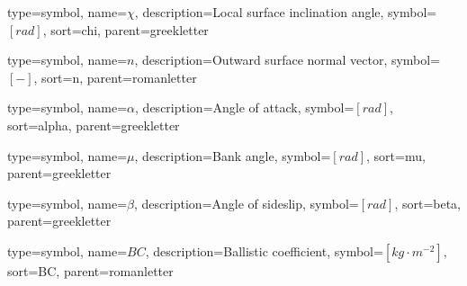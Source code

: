{
	type=symbol, %
	name={\ensuremath{\chi}}, %
	description={Local surface inclination angle}, %
	symbol={$\left[rad \right]$}, %
	sort=chi, %
	parent=greekletter %
}

{
	type=symbol, %
	name={\ensuremath{n}}, %
	description={Outward surface normal vector}, %
	symbol={$\left[- \right]$}, %
	sort=n, %
	parent=romanletter %
}

{
	type=symbol, %
	name={\ensuremath{\alpha}}, %
	description={Angle of attack}, %
	symbol={$\left[rad \right]$}, %
	sort=alpha, %
	parent=greekletter %
}

{
	type=symbol, %
	name={\ensuremath{\mu}}, %
	description={Bank angle}, %
	symbol={$\left[rad \right]$}, %
	sort=mu, %
	parent=greekletter %
}

{
	type=symbol, %
	name={\ensuremath{\beta}}, %
	description={Angle of sideslip}, %
	symbol={$\left[rad \right]$}, %
	sort=beta, %
	parent=greekletter %
}

{
type=symbol, %
name={\ensuremath{BC}}, %
description={Ballistic coefficient}, %
symbol={$\left[kg\cdot m^{-2} \right]$}, %
sort=BC, %
parent=romanletter %
}

